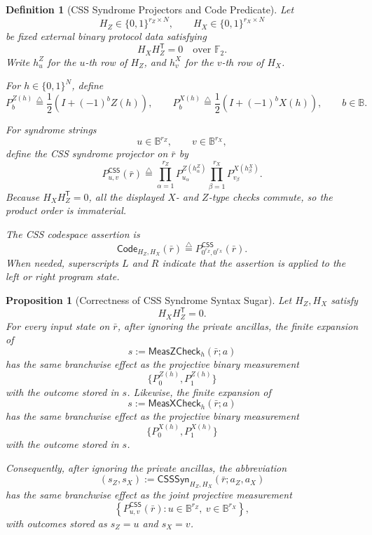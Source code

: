 \documentclass[acmsmall,screen,review,anonymous,nonacm]{acmart}
\newtheorem{definition}{Definition}[section]
\theoremstyle{defn_style}
\newtheorem{pro}{Proposition}[section]
\begin{document}
\begin{definition}[CSS Syndrome Projectors and Code Predicate]
Let
\[
H_Z\in\{0,1\}^{r_Z\times N},
\qquad
H_X\in\{0,1\}^{r_X\times N}
\]
be fixed external binary protocol data satisfying
\[
H_XH_Z^{\mathsf T}=0
\quad\text{over }\mathbb F_2.
\]
Write \(h^Z_u\) for the \(u\)-th row of \(H_Z\), and \(h^X_v\) for the
\(v\)-th row of \(H_X\).

For \(h\in\{0,1\}^N\), define
\[
P^{Z(h)}_{b}
\stackrel{\triangle}{=}
\frac12\left(I+(-1)^b Z(h)\right),
\qquad
P^{X(h)}_{b}
\stackrel{\triangle}{=}
\frac12\left(I+(-1)^b X(h)\right),
\qquad b\in\mathbb B.
\]

For syndrome strings
\[
u\in\mathbb B^{r_Z},
\qquad
v\in\mathbb B^{r_X},
\]
define the CSS syndrome projector on \(\bar r\) by
\[
P^{\mathsf{CSS}}_{u,v}(\bar r)
\stackrel{\triangle}{=}
\prod_{\alpha=1}^{r_Z}
P^{Z(h^Z_\alpha)}_{u_\alpha}
\prod_{\beta=1}^{r_X}
P^{X(h^X_\beta)}_{v_\beta}.
\]
Because \(H_XH_Z^{\mathsf T}=0\), all the displayed \(X\)- and \(Z\)-type
checks commute, so the product order is immaterial.

The CSS codespace assertion is
\[
\mathsf{Code}_{H_Z,H_X}(\bar r)
\stackrel{\triangle}{=}
P^{\mathsf{CSS}}_{0^{r_Z},0^{r_X}}(\bar r).
\]
When needed, superscripts \(L\) and \(R\) indicate that the assertion is applied
to the left or right program state.
\end{definition}

\begin{pro}[Correctness of CSS Syndrome Syntax Sugar]
\label{prop:csssyn-expansion}
Let \(H_Z,H_X\) satisfy
\[
H_XH_Z^{\mathsf T}=0 .
\]
For every input state on \(\bar r\), after ignoring the private ancillas, the
finite expansion of
\[
s:=\mathsf{MeasZCheck}_{h}(\bar r;a)
\]
has the same branchwise effect as the projective binary measurement
\[
\{P^{Z(h)}_0,P^{Z(h)}_1\}
\]
with the outcome stored in \(s\). Likewise, the finite expansion of
\[
s:=\mathsf{MeasXCheck}_{h}(\bar r;a)
\]
has the same branchwise effect as the projective binary measurement
\[
\{P^{X(h)}_0,P^{X(h)}_1\}
\]
with the outcome stored in \(s\).

Consequently, after ignoring the private ancillas, the abbreviation
\[
(s_Z,s_X):=
\mathsf{CSSSyn}_{H_Z,H_X}(\bar r;a_Z,a_X)
\]
has the same branchwise effect as the joint projective measurement
\[
\left\{
P^{\mathsf{CSS}}_{u,v}(\bar r)
:
u\in\mathbb B^{r_Z},
\ v\in\mathbb B^{r_X}
\right\},
\]
with outcomes stored as \(s_Z=u\) and \(s_X=v\).
\end{pro}
\end{document}
